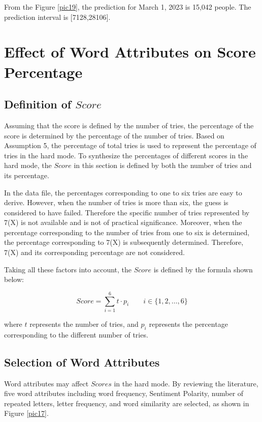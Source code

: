 \documentclass[12pt]{article}  %
\begin{document}
From the Figure \ref{pic19}, the prediction for March 1, 2023 is 15,042 people. The prediction interval is [7128,28106].


\section{Effect of Word Attributes on Score Percentage}
\subsection{Definition of $Score$}
Assuming that the score is defined by the number of tries, the percentage of the score is determined by the percentage of the number of tries. Based on Assumption 5, the percentage of total tries is used to represent the percentage of tries in the hard mode. To synthesize the percentages of different scores in the hard mode, the $Score$ in this section is defined by both the number of tries and its percentage.

In the data file, the percentages corresponding to one to six tries are easy to derive. However, when the number of tries is more than six, the guess is considered to have failed. Therefore the specific number of tries represented by 7(X) is not available and is not of practical significance. Moreover, when the percentage corresponding to the number of tries from one to six is determined, the percentage corresponding to 7(X) is subsequently determined. Therefore, 7(X) and its corresponding percentage are not considered.

Taking all these factors into account, the $Score$ is defined by the formula shown below:

\begin{equation}
	Score=\sum_{i=1}^6 t \cdot p_i  \qquad i \in \{1,2,\dots,6\}
\end{equation}

where $t$ represents the number of tries, and $p_i$ represents the percentage corresponding to the different number of tries.

\subsection{Selection of Word Attributes}
Word attributes may affect $Scores$ in the hard mode. By reviewing the literature\cite{3}, five word attributes including word frequency, Sentiment Polarity, number of repeated letters, letter frequency, and word similarity are selected, as shown in Figure \ref{pic17}.
\end{document}
